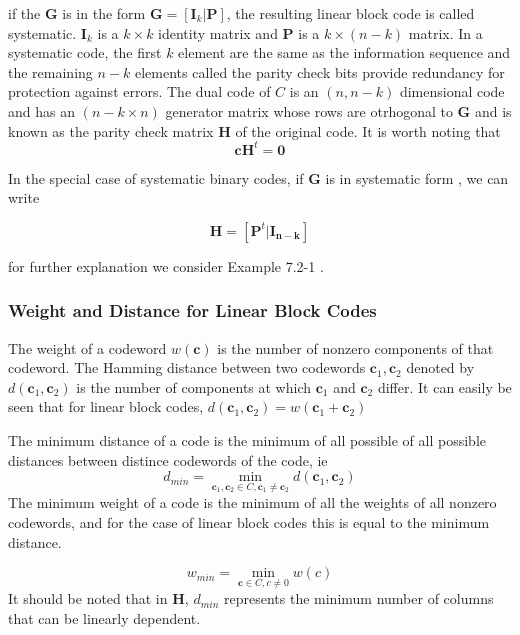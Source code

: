 \documentclass[fontsize=12pt]{article}
\begin{document}
 if the $\mathbf{G}$ is in the form $\mathbf{G}=[\mathbf{I}_k | \mathbf{P}]$, the resulting linear block code is called systematic. $\mathbf{I}_k$ is a $k \times k$ identity matrix and  $\mathbf{P}$ is a $k \times (n-k)$ matrix. In a systematic code, the first $k$ element are the same as the information sequence and the remaining $n - k$ elements called the parity check bits provide redundancy for protection against errors.
 The dual code of $C$ is an $(n, n-k)$ dimensional code and has an $(n-k \times n)$  generator matrix whose rows are otrhogonal to $\mathbf{G}$ and is known as the parity check matrix $\mathbf{H}$ of the original code. It is worth noting that 
 $$ \mathbf{c}\mathbf{H}^t=\mathbf{0}$$
 
 In the special case of systematic binary codes, if $\mathbf{G}$ is in systematic form , we can write 
 
 \begin{equation}
 \mathbf{H}=[\mathbf{P}^t | \mathbf{I_{n-k}}]
 \end{equation}
 
 for further explanation we consider Example 7.2-1 . 
 
 \subsubsection{Weight and Distance for Linear Block Codes}
 The weight of a codeword $w(\mathbf{c})$ is the number of nonzero components of that codeword. The Hamming distance between two codewords $\mathbf{c}_1,\mathbf{c}_2$ denoted by $d(\mathbf{c}_1,\mathbf{c}_2)$ is the number of components at which $\mathbf{c}_1$ and $\mathbf{c}_2$ differ. It can easily be seen that for linear block codes, $d(\mathbf{c}_1,\mathbf{c}_2) = w(\mathbf{c}_1 + \mathbf{c}_2)$
 
 The minimum distance of a code is the minimum of all possible of all possible distances between distince codewords of the code, ie
 \begin{equation}
 d_{min} = \min_{\mathbf{c}_1,\mathbf{c}_2\in C,\mathbf{c}_1\neq \mathbf{c}_2}  d(\mathbf{c}_1,\mathbf{c}_2)
 \end{equation}
 The minimum weight of a code is the minimum of all the weights of all nonzero codewords, and for the case of linear block codes this is equal to the minimum distance.
 
 \begin{equation}
 w_{min} = \min_{\mathbf{c} \in C, c\neq 0} w(c)
 \end{equation}
 It should be noted that in $\mathbf{H}$, $d_{min}$ represents the minimum number of columns that can be linearly dependent.
 
\end{document}
